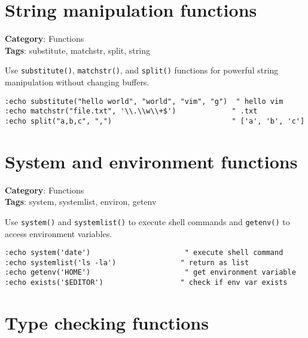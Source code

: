 \section{String manipulation functions}

\textbf{Category}: Functions\\ \textbf{Tags}: substitute, matchstr, split, string
\vspace{0.5cm}

Use {\footnotesize \Verb§substitute()§}, {\footnotesize \Verb§matchstr()§}, and {\footnotesize \Verb§split()§} functions for powerful string manipulation without changing buffers.

\begin{Exa*}{}
\begin{Verbatim}[fontsize=\footnotesize, breaklines, breakanywhere]
:echo substitute("hello world", "world", "vim", "g")  " hello vim
:echo matchstr("file.txt", '\\.\\w\\+$')             " .txt
:echo split("a,b,c", ",")                            " ['a', 'b', 'c']
\end{Verbatim}
\end{Exa*}

\section{System and environment functions}

\textbf{Category}: Functions\\ \textbf{Tags}: system, systemlist, environ, getenv
\vspace{0.5cm}

Use {\footnotesize \Verb§system()§} and {\footnotesize \Verb§systemlist()§} to execute shell commands and {\footnotesize \Verb§getenv()§} to access environment variables.

\begin{Exa*}{}
\begin{Verbatim}[fontsize=\footnotesize, breaklines, breakanywhere]
:echo system('date')                      " execute shell command
:echo systemlist('ls -la')               " return as list
:echo getenv('HOME')                      " get environment variable
:echo exists('$EDITOR')                  " check if env var exists
\end{Verbatim}
\end{Exa*}

\section{Type checking functions}

